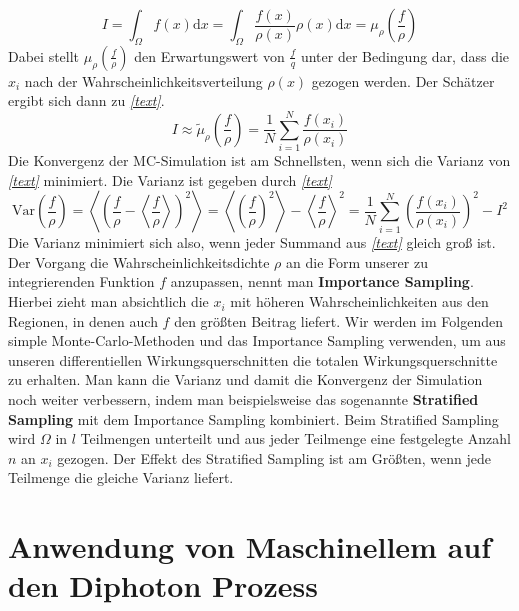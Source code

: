 \begin{equation}
I = \int_{\Omega} f(x) \text{d}x =  \int_{\Omega} \frac{f(x)}{\rho(x)}\rho(x) \text{d}x = \mu_{\rho}\left(\frac{f}{\rho}\right)
\end{equation}
Dabei stellt $\mu_{\rho}\left(\frac{f}{\rho}\right)$ den Erwartungswert von $\frac{f}{q}$ unter der Bedingung dar, dass die $x_i$ nach der Wahrscheinlichkeitsverteilung $\rho(x)$ gezogen werden. Der Schätzer ergibt sich dann zu \textit{\autoref{text}}.
\begin{equation}
I \approx \tilde{\mu}_{\rho}\left(\frac{f}{\rho}\right) = \frac{1}{N}\sum_{i=1}^{N}\frac{f(x_i)}{\rho(x_i)}
\end{equation}
Die Konvergenz der MC-Simulation ist am Schnellsten, wenn sich die Varianz von \textit{\autoref{text}} minimiert. Die Varianz ist gegeben durch \textit{\autoref{text}}
\begin{equation}
\text{Var}\left(\frac{f}{\rho}\right) = \left\langle\left(\frac{f}{\rho} - \left\langle \frac{f}{\rho}\right\rangle \right)^2 \right\rangle = \left\langle \left(\frac{f}{\rho}\right)^2 \right\rangle - \left\langle\frac{f}{\rho} \right\rangle^2 = \frac{1}{N} \sum_{i=1}^{N}\left(\frac{f(x_i)}{\rho(x_i)}\right)^2 - I^2
\end{equation}
Die Varianz minimiert sich also, wenn jeder Summand aus \textit{\autoref{text}} gleich groß ist. Der Vorgang die Wahrscheinlichkeitsdichte $\rho$ an die Form unserer zu integrierenden Funktion $f$ anzupassen, nennt man \textbf{Importance Sampling}. Hierbei zieht man absichtlich die $x_i$ mit höheren Wahrscheinlichkeiten aus den Regionen, in denen auch $f$ den größten Beitrag liefert. 
\newline
\newline
Wir werden im Folgenden simple Monte-Carlo-Methoden und das Importance Sampling verwenden, um aus unseren differentiellen Wirkungsquerschnitten die totalen Wirkungsquerschnitte zu erhalten. Man kann die Varianz und damit die Konvergenz der Simulation noch weiter verbessern, indem man beispielsweise das sogenannte \textbf{Stratified Sampling} mit dem Importance Sampling kombiniert. Beim Stratified Sampling wird $\Omega$ in $l$ Teilmengen unterteilt und aus jeder Teilmenge eine festgelegte Anzahl $n$ an $x_i$ gezogen. Der Effekt des Stratified Sampling ist am Größten, wenn jede Teilmenge die gleiche Varianz liefert.   


\chapter{Anwendung von Maschinellem auf den Diphoton Prozess}
